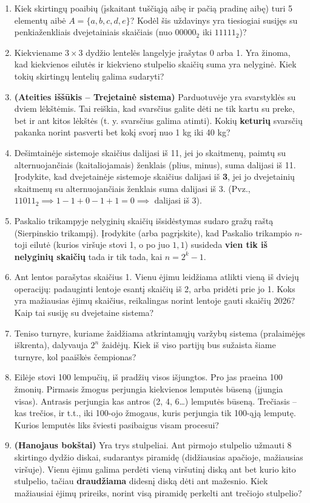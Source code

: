 \documentclass[11pt,a4paper]{scrartcl}
\begin{document}
\begin{enumerate}
    \item Kiek skirtingų poaibių (įskaitant tuščiąją aibę ir pačią pradinę aibę) turi 5 elementų aibė $A = \{a, b, c, d, e\}$? Kodėl šis uždavinys yra tiesiogiai susijęs su penkiaženkliais dvejetainiais skaičiais (nuo $00000_2$ iki $11111_2$)?
    \item Kiekviename $3 \times 3$ dydžio lentelės langelyje įrašytas 0 arba 1. Yra žinoma, kad kiekvienos eilutės ir kiekvieno stulpelio skaičių suma yra nelyginė. Kiek tokių skirtingų lentelių galima sudaryti?
    \item \textbf{(Ateities iššūkis – Trejetainė sistema)} Parduotuvėje yra svarstyklės su dviem lėkštėmis. Tai reiškia, kad svarsčius galite dėti ne tik kartu su preke, bet ir ant kitos lėkštės (t. y. svarsčius galima atimti). Kokių \textbf{keturių} svarsčių pakanka norint pasverti bet kokį svorį nuo 1 kg iki 40 kg?
    \item Dešimtainėje sistemoje skaičius dalijasi iš 11, jei jo skaitmenų, paimtų su alternuojančiais (kaitaliojamais) ženklais (plius, minus), suma dalijasi iš 11. Įrodykite, kad dvejetainėje sistemoje skaičius dalijasi iš \textbf{3}, jei jo dvejetainių skaitmenų su alternuojančiais ženklais suma dalijasi iš 3. (Pvz., $11011_2 \implies 1-1+0-1+1 = 0 \implies$ dalijasi iš 3).
    \item Paskalio trikampyje nelyginių skaičių išsidėstymas sudaro gražų raštą (Sierpinskio trikampį). Įrodykite (arba pagrįskite), kad Paskalio trikampio $n$-toji eilutė (kurios viršuje stovi 1, o po juo $1, 1$) susideda \textbf{vien tik iš nelyginių skaičių} tada ir tik tada, kai $n = 2^k - 1$.
    \item Ant lentos parašytas skaičius 1. Vienu ėjimu leidžiama atlikti vieną iš dviejų operacijų: padauginti lentoje esantį skaičių iš 2, arba pridėti prie jo 1. Koks yra mažiausias ėjimų skaičius, reikalingas norint lentoje gauti skaičių 2026? Kaip tai susiję su dvejetaine sistema?
    
    \item Teniso turnyre, kuriame žaidžiama atkrintamųjų varžybų sistema (pralaimėjęs iškrenta), dalyvauja $2^n$ žaidėjų. Kiek iš viso partijų bus sužaista šiame turnyre, kol paaiškės čempionas?
    \item Eilėje stovi 100 lempučių, iš pradžių visos išjungtos. Pro jas praeina 100 žmonių. Pirmasis žmogus perjungia kiekvienos lemputės būseną (įjungia visas). Antrasis perjungia kas antros (2, 4, 6\dots) lemputės būseną. Trečiasis – kas trečios, ir t.t., iki 100-ojo žmogaus, kuris perjungia tik 100-ąją lemputę. Kurios lemputės liks šviesti pasibaigus visam procesui?
    \item \textbf{(Hanojaus bokštai)} Yra trys stulpeliai. Ant pirmojo stulpelio užmauti 8 skirtingo dydžio diskai, sudarantys piramidę (didžiausias apačioje, mažiausias viršuje). Vienu ėjimu galima perdėti vieną viršutinį diską ant bet kurio kito stulpelio, tačiau \textbf{draudžiama} didesnį diską dėti ant mažesnio. Kiek mažiausiai ėjimų prireiks, norint visą piramidę perkelti ant trečiojo stulpelio?
    

\end{enumerate}
\end{document}
